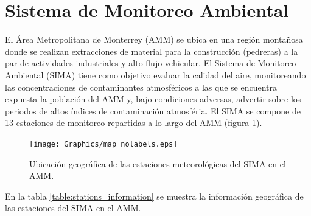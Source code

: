\section{Sistema de Monitoreo Ambiental}
El Área Metropolitana de Monterrey (AMM) se ubica en una región montañosa donde se realizan extracciones de material para la construcción (pedreras) a la par de actividades industriales y alto flujo vehicular. El Sistema de Monitoreo Ambiental (SIMA) tiene como objetivo evaluar la calidad del aire, monitoreando las concentraciones de contaminantes atmosféricos a las que se encuentra expuesta la población del AMM y, bajo condiciones adversas, advertir sobre los periodos de altos índices de contaminación atmosféria. El SIMA se compone de 13 estaciones de monitoreo repartidas a lo largo del AMM (figura \ref{fig:stations}).
\begin{figure}[H]
	\centering
	\texttt{[image: Graphics/map\_nolabels.eps]}
	\caption{Ubicación geográfica de las estaciones meteorológicas del SIMA en el AMM.}
	\label{fig:stations}
\end{figure}
En la tabla \ref{table:stations_information} se muestra la información geográfica de las estaciones del SIMA en el AMM.
